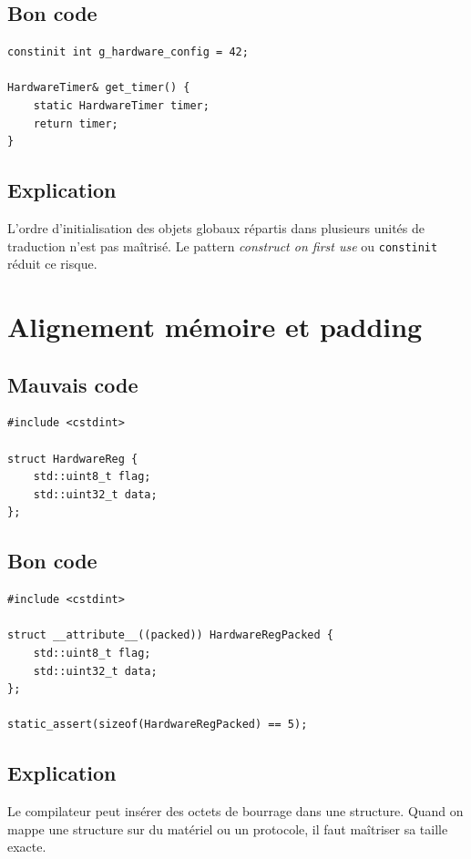 \documentclass[a4paper,11pt]{report}
\begin{document}
\section{Bon code}
\begin{lstlisting}
constinit int g_hardware_config = 42;

HardwareTimer& get_timer() {
    static HardwareTimer timer;
    return timer;
}
\end{lstlisting}

\section{Explication}
L'ordre d'initialisation des objets globaux répartis dans plusieurs unités de traduction n'est pas maîtrisé.
Le pattern \emph{construct on first use} ou \texttt{constinit} réduit ce risque.

\chapter{Alignement mémoire et padding}

\section{Mauvais code}
\begin{lstlisting}
#include <cstdint>

struct HardwareReg {
    std::uint8_t flag;
    std::uint32_t data;
};
\end{lstlisting}

\section{Bon code}
\begin{lstlisting}
#include <cstdint>

struct __attribute__((packed)) HardwareRegPacked {
    std::uint8_t flag;
    std::uint32_t data;
};

static_assert(sizeof(HardwareRegPacked) == 5);
\end{lstlisting}

\section{Explication}
Le compilateur peut insérer des octets de bourrage dans une structure.
Quand on mappe une structure sur du matériel ou un protocole, il faut maîtriser sa taille exacte.
\end{document}
